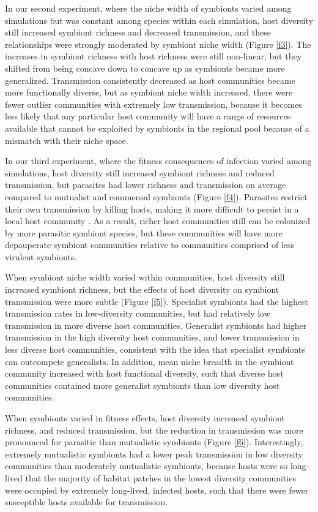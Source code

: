 In our second experiment, where the niche width of symbionts varied among simulations but was constant among species within each simulation, host diversity still increased symbiont richness and decreased transmission, and these relationships were strongly moderated by symbiont niche width (Figure \ref{f3}).
The increases in symbiont richness with host richness were still non-linear, but they shifted from being concave down to concave up as symbionts became more generalized.
Transmission consistently decreased as host communities became more functionally diverse, but as symbiont niche width increased, there were fewer outlier communities with extremely low transmission, because it becomes less likely that any particular host community will have a range of resources available that cannot be exploited by symbionts in the regional pool because of a mismatch with their niche space.

In our third experiment, where the fitness consequences of infection varied among simulations, host diversity still increased symbiont richness and reduced transmission, but parasites had lower richness and transmission on average compared to mutualist and commensal symbionts (Figure \ref{f4}).
Parasites restrict their own transmission by killing hosts, making it more difficult to persist in a local host community \citep{Wood1996}.
As a result, richer host communities still can be colonized by more parasitic symbiont species, but these communities will have more depauperate symbiont communities relative to communities comprised of less virulent symbionts.

When symbiont niche width varied within communities, host diversity still increased symbiont richness, but the effects of host diversity on symbiont transmission were more subtle (Figure \ref{f5}).
Specialist symbionts had the highest transmission rates in low-diversity communities, but had relatively low transmission in more diverse host communities.
Generalist symbionts had higher transmission in the high diversity host communities, and lower transmission in less diverse host communities, consistent with the idea that specialist symbionts can outcompete generalists.
In addition, mean niche breadth in the symbiont community increased with host functional diversity, such that diverse host communities contained more generalist symbionts than low diversity host communities.

When symbionts varied in fitness effects, host diversity increased symbiont richness, and reduced transmission, but the reduction in transmission was more pronounced for parasitic than mutualistic symbionts (Figure \ref{f6}).
Interestingly, extremely mutualistic symbionts had a lower peak transmission in low diversity communities than moderately mutualistic symbionts, because hosts were so long-lived that the majority of habitat patches in the lowest diversity communities were occupied by extremely long-lived, infected hosts, such that there were fewer susceptible hosts available for transmission.

